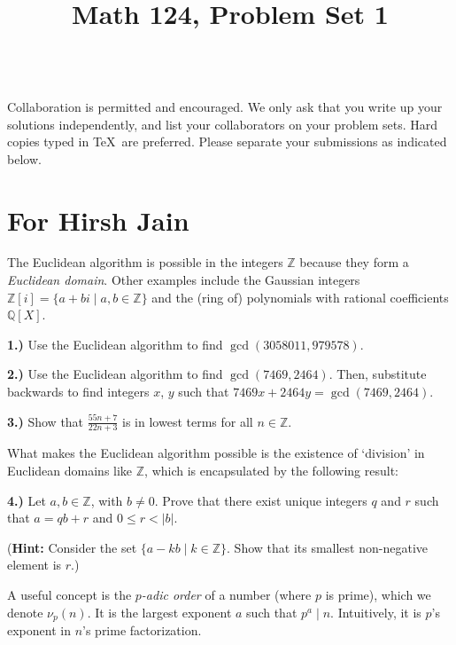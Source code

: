 \documentclass[10pt]{amsart}
\title{Math 124, Problem Set 1}
\begin{document}
\maketitle

\\
 Collaboration is permitted and encouraged. We only ask that you write up your solutions independently, and list your collaborators on your problem sets. Hard copies typed in \TeX\  are preferred. Please separate your submissions as indicated below.

\section*{For Hirsh Jain}

\noindent The Euclidean algorithm is possible in the integers $\mathbb{Z}$ because they form a \emph{Euclidean domain}. Other examples include the Gaussian integers $\mathbb{Z}[i] = \{a + bi \mid a,b \in \mathbb{Z}\}$ and the (ring of) polynomials with rational coefficients $\mathbb{Q}[X]$. 

\medskip

{\bf 1.)} Use the Euclidean algorithm to find $\gcd(3058011, 979578)$. 

\medskip

{\bf 2.)} Use the Euclidean algorithm to find $\gcd(7469,2464)$. Then, substitute backwards to find integers $x$, $y$ such that $7469x + 2464y = \gcd(7469,2464)$.

\medskip

{\bf 3.)} Show that $\frac{55n + 7}{22n + 3}$ is in lowest terms for all $n \in \mathbb{Z}$.

\medskip

\noindent What makes the Euclidean algorithm possible is the existence of `division' in Euclidean domains like $\mathbb{Z}$, which is encapsulated by the following result:

\medskip
{\bf 4.)} Let $a, b \in \mathbb{Z}$, with $b \ne 0$. Prove that there exist unique integers $q$ and $r$ such that $a = qb + r$ and $0 \le r < |b|$.

\smallskip
({\bf Hint:} Consider the set $\{a - kb \mid k \in \mathbb{Z}\}$. Show that its smallest non-negative element is $r$.)

\medskip

\noindent A useful concept is the \emph{$p$-adic order} of a number (where $p$ is prime), which we denote $\nu_p(n)$. It is the largest exponent $a$ such that $p^a \mid n$. Intuitively, it is $p$'s exponent in $n$'s prime factorization.
\end{document}
